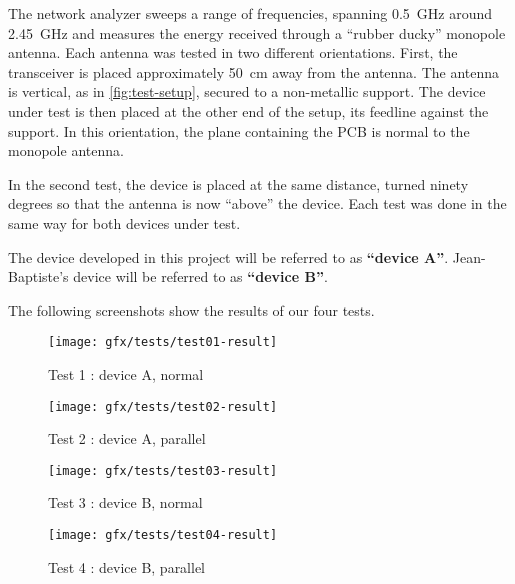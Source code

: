 The network analyzer sweeps a range of frequencies, spanning \SI{0.5}{GHz}
around \SI{2.45}{GHz} and measures the energy received through a ``rubber
ducky'' monopole antenna. Each antenna was tested in two different orientations.
First, the transceiver is placed approximately \SI{50}{cm} away from the
antenna. The antenna is vertical, as in \autoref{fig:test-setup}, secured to
a non-metallic support. The device under test is then placed at the other end of
the setup, its feedline against the support. In this orientation, the plane
containing the PCB is normal to the monopole antenna.

In the second test, the device is placed at the same distance, turned
ninety degrees so
that the antenna is now ``above'' the device. Each test was done in the same way
for both devices under test.

The device developed in this project will be referred to as \textbf{``device A''}.
Jean-Baptiste's device will be referred to as \textbf{``device B''}.


The following screenshots show the results of our four tests.

\begin{figure}[h!]
  \begin{center}
    \texttt{[image: gfx/tests/test01-result]}
  \end{center}
  \caption{Test 1 : device A, normal}
  \label{fig:test01-result}
\end{figure}

\begin{figure}[h!]
  \begin{center}
    \texttt{[image: gfx/tests/test02-result]}
  \end{center}
  \caption{Test 2 : device A, parallel}
  \label{fig:test02-result}
\end{figure}

\begin{figure}[h!]
  \begin{center}
    \texttt{[image: gfx/tests/test03-result]}
  \end{center}
  \caption{Test 3 : device B, normal}
  \label{fig:test03-result}
\end{figure}

\begin{figure}[h!]
  \begin{center}
    \texttt{[image: gfx/tests/test04-result]}
  \end{center}
  \caption{Test 4 : device B, parallel}
  \label{fig:test04-result}
\end{figure}

